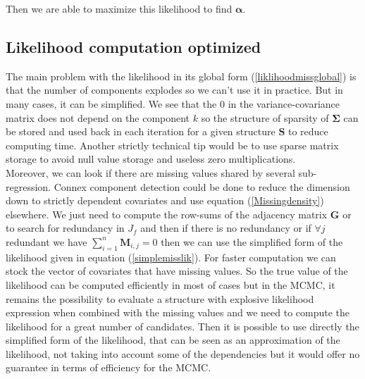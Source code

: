 \documentclass[12pt,a4paper]{report}
\begin{document}
Then we are able to maximize this likelihood to find $\boldsymbol{\alpha}$.
	\subsection{Likelihood computation optimized}
	The main problem with the likelihood in its global form (\ref{liklihoodmissglobal}) is that the number of components explodes so we can't use it in practice. But in many cases, it can be simplified.
We see that the $0$ in the variance-covariance matrix does not depend on the component $k$ so the structure of sparsity of $\boldsymbol{\Sigma}$ can be stored and used back in each iteration for a given structure $\boldsymbol{S}$ to reduce computing time.  Another strictly technical tip would be to use sparse matrix storage to avoid null value storage and useless zero multiplications.\\

		Moreover, we can look if there are missing values shared by several sub-regression. 
		Connex component detection could be done to reduce the dimension down to strictly dependent covariates and use equation (\ref{Missingdensity}) elsewhere.
		We just need to compute the  row-sums of the adjacency matrix $\boldsymbol{G}$ or to search for redundancy in $J_f$ and then if there is no redundancy or if $\forall j$ redundant we have $\sum_{i=1}^n\boldsymbol{M}_{i,j}=0$ then we can use the simplified form of the likelihood given in equation (\ref{simplemisslik}). For faster computation we can stock the vector of covariates that have missing values.
		So the true value of the likelihood can be computed efficiently in most of cases but in the MCMC, it remains the possibility to evaluate a structure with explosive likelihood expression when combined with the missing values and we need to compute the likelihood for a great number of candidates. Then it is possible to use directly the simplified form of the likelihood, that can be seen as an approximation of the likelihood, not taking into account some of the dependencies but it would offer no guarantee in terms of efficiency for the MCMC. %
\end{document}
